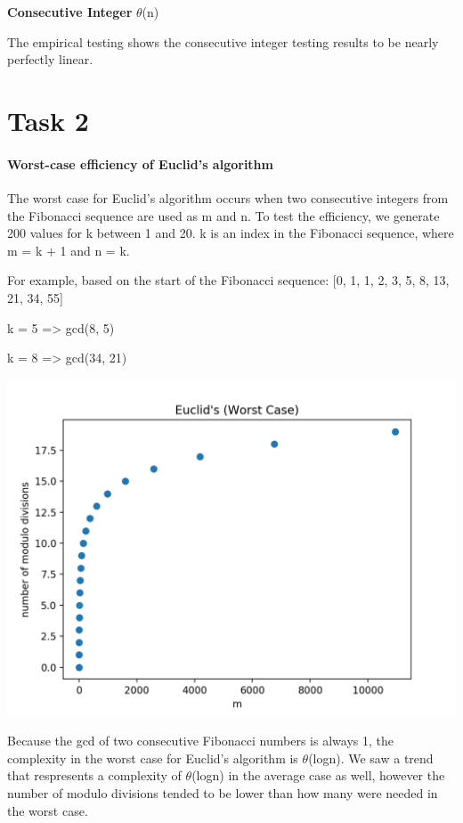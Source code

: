 \documentclass{report}
\begin{document}
\begin{flushleft}
		\textbf{Consecutive Integer} $\theta$(n)

		The empirical testing shows the consecutive integer testing results to be nearly perfectly linear.

		\section{Task 2}

		\paragraph{Worst-case efficiency of Euclid's algorithm}
		The worst case for Euclid's algorithm occurs when two consecutive integers from the Fibonacci sequence are used as m and n. To test
		the efficiency, we generate 200 values for k between 1 and 20. k is an index in the Fibonacci sequence, where m = k + 1 and n = k.

		For example, based on the start of the Fibonacci sequence: [0, 1, 1, 2, 3, 5, 8, 13, 21, 34, 55]

		k = 5 => gcd(8, 5)

		k = 8 => gcd(34, 21)

		\includegraphics{task2}

		Because the gcd of two consecutive Fibonacci numbers is always 1, the complexity in the worst case for Euclid's algorithm
		is $\theta$(logn). We saw a trend that respresents a complexity of $\theta$(logn) in the average case as well, however the number
		of modulo divisions tended to be lower than how many were needed in the worst case.


\end{flushleft}
\end{document}
